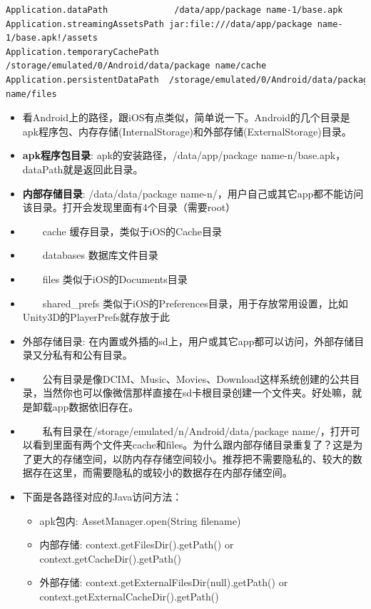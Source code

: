 \documentclass[9pt, b5paper]{article}
\begin{document}
\begin{verbatim}
Application.dataPath             /data/app/package name-1/base.apk
Application.streamingAssetsPath jar:file:///data/app/package name-1/base.apk!/assets
Application.temporaryCachePath  /storage/emulated/0/Android/data/package name/cache
Application.persistentDataPath  /storage/emulated/0/Android/data/package name/files
\end{verbatim}
\begin{itemize}
\item 看Android上的路径，跟iOS有点类似，简单说一下。Android的几个目录是apk程序包、内存存储(InternalStorage)和外部存储(ExternalStorage)目录。
\item \textbf{apk程序包目录}: apk的安装路径，/data/app/package name-n/base.apk，dataPath就是返回此目录。
\item \textbf{内部存储目录}: /data/data/package name-n/，用户自己或其它app都不能访问该目录。打开会发现里面有4个目录（需要root）
\item     cache 缓存目录，类似于iOS的Cache目录
\item     databases 数据库文件目录
\item     files 类似于iOS的Documents目录
\item     shared\_prefs 类似于iOS的Preferences目录，用于存放常用设置，比如Unity3D的PlayerPrefs就存放于此
\item 外部存储目录: 在内置或外插的sd上，用户或其它app都可以访问，外部存储目录又分私有和公有目录。
\item     公有目录是像DCIM、Music、Movies、Download这样系统创建的公共目录，当然你也可以像微信那样直接在sd卡根目录创建一个文件夹。好处嘛，就是卸载app数据依旧存在。
\item     私有目录在/storage/emulated/n/Android/data/package name/，打开可以看到里面有两个文件夹cache和files。为什么跟内部存储目录重复了？这是为了更大的存储空间，以防内存存储空间较小。推荐把不需要隐私的、较大的数据存在这里，而需要隐私的或较小的数据存在内部存储空间。
\item 下面是各路径对应的Java访问方法：
\begin{itemize}
\item apk包内: AssetManager.open(String filename)
\item 内部存储: context.getFilesDir().getPath() or context.getCacheDir().getPath()
\item 外部存储: context.getExternalFilesDir(null).getPath() or context.getExternalCacheDir().getPath()
\end{itemize}
\end{itemize}
\end{document}
